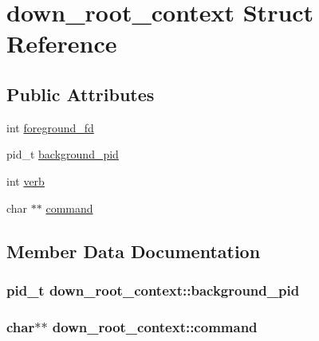 \hypertarget{structdown__root__context}{}\section{down\+\_\+root\+\_\+context Struct Reference}
\label{structdown__root__context}
\subsection*{Public Attributes}
\begin{DoxyCompactItemize}
\item 
int \hyperlink{structdown__root__context_aabe423adf44fd5100e1990396be5096d}{foreground\+\_\+fd}
\item 
pid\+\_\+t \hyperlink{structdown__root__context_a876b406a31eb644f3b5f8917662536d9}{background\+\_\+pid}
\item 
int \hyperlink{structdown__root__context_aa6ccc976a2d6c68b164b259aadd833f9}{verb}
\item 
char $\ast$$\ast$ \hyperlink{structdown__root__context_af2e87dd5f7094f1ddd56b1b7a0161271}{command}
\end{DoxyCompactItemize}


\subsection{Member Data Documentation}
\hypertarget{structdown__root__context_a876b406a31eb644f3b5f8917662536d9}{}
\subsubsection[{background\+\_\+pid}]{\setlength{\rightskip}{0pt plus 5cm}pid\+\_\+t down\+\_\+root\+\_\+context\+::background\+\_\+pid}\label{structdown__root__context_a876b406a31eb644f3b5f8917662536d9}
\hypertarget{structdown__root__context_af2e87dd5f7094f1ddd56b1b7a0161271}{}
\subsubsection[{command}]{\setlength{\rightskip}{0pt plus 5cm}char$\ast$$\ast$ down\+\_\+root\+\_\+context\+::command}\label{structdown__root__context_af2e87dd5f7094f1ddd56b1b7a0161271}
\hypertarget{structdown__root__context_aabe423adf44fd5100e1990396be5096d}{}

